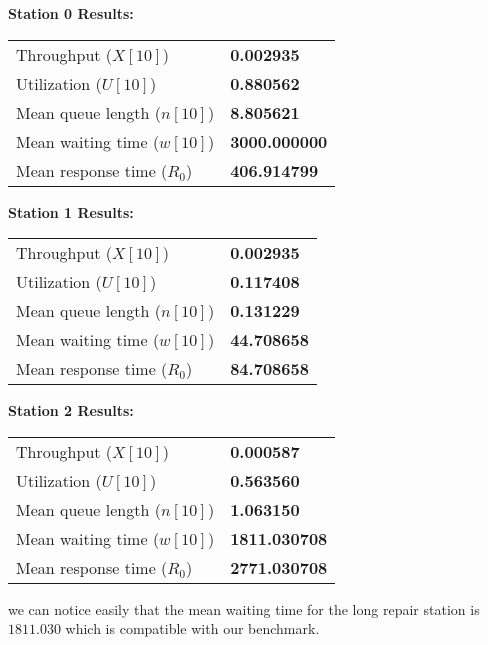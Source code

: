 \documentclass[12pt]{article}
\begin{document}
	\noindent\textbf{Station 0 Results:}
	\begin{table}[h!]
		\centering
		\begin{tabular}{@{}l l@{}}
			\toprule
			Throughput ($X[10]$)              & \textbf{0.002935} \\
			Utilization ($U[10]$)             & \textbf{0.880562} \\
			Mean queue length ($n[10]$)       & \textbf{8.805621} \\
			Mean waiting time ($w[10]$)       & \textbf{3000.000000} \\
			Mean response time ($R_0$)        & \textbf{406.914799} \\
			\bottomrule
		\end{tabular}
	\end{table}
	
	\noindent\textbf{Station 1 Results:}
	\begin{table}[h!]
		\centering
		\begin{tabular}{@{}l l@{}}
			\toprule
			Throughput ($X[10]$)              & \textbf{0.002935} \\
			Utilization ($U[10]$)             & \textbf{0.117408} \\
			Mean queue length ($n[10]$)       & \textbf{0.131229} \\
			Mean waiting time ($w[10]$)       & \textbf{44.708658} \\
			Mean response time ($R_0$)        & \textbf{84.708658} \\
			\bottomrule
		\end{tabular}
	\end{table}
	
	\noindent\textbf{Station 2 Results:}
	\begin{table}[h!]
		\centering
		\begin{tabular}{@{}l l@{}}
			\toprule
			Throughput ($X[10]$)              & \textbf{0.000587} \\
			Utilization ($U[10]$)             & \textbf{0.563560} \\
			Mean queue length ($n[10]$)       & \textbf{1.063150} \\
			Mean waiting time ($w[10]$)       & \textbf{1811.030708} \\
			Mean response time ($R_0$)        & \textbf{2771.030708} \\
			\bottomrule
		\end{tabular}
	\end{table}
	
	
	we can notice easily that the mean waiting time for the long repair station is $1811.030$ which is compatible with our benchmark. 
	
\end{document}
